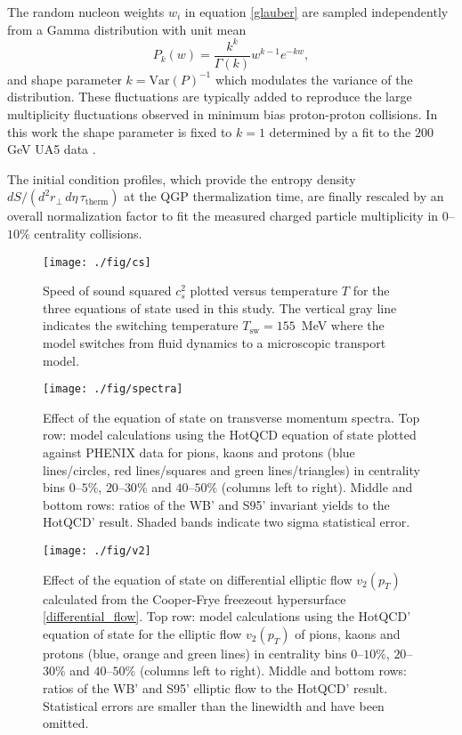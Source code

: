 \documentclass[aps,prc,reprint,amsmath,nofootinbib,superscriptaddress]{revtex4-1}
\begin{document}
The random nucleon weights $w_i$ in equation \eqref{glauber} are sampled independently from a Gamma distribution with unit mean
\begin{equation}
 P_k(w) = \frac{k^k}{\Gamma(k)} w^{k-1} e^{-k w},
\end{equation}
and shape parameter $k = \text{Var}(P)^{-1}$ which modulates the variance of the distribution. 
These fluctuations are typically added \cite{?} to reproduce the large multiplicity fluctuations observed in minimum bias proton-proton collisions. 
In this work the shape parameter is fixed to $k=1$ determined by a fit to the $200$ GeV UA5 data \cite{?}. 

The initial condition profiles, which provide the entropy density $dS/(d^2r_\perp\, d\eta\, \tau_\text{therm})$ at the QGP thermalization time, are finally 
rescaled by an overall normalization factor to fit the measured charged particle multiplicity in $0$--$10\%$ centrality collisions.

\begin{figure}
  \texttt{[image: ./fig/cs]}
  \caption{\label{fig:cs} Speed of sound squared $c_s^2$ plotted versus temperature $T$ for the three equations of state used in this study. The vertical
	   gray line indicates the switching temperature $T_\text{sw} = 155$~MeV where the model switches from fluid dynamics to a microscopic transport model.}
\end{figure}

\begin{figure*}[t]
  \texttt{[image: ./fig/spectra]}
  \caption{
    \label{fig:spectra} Effect of the equation of state on transverse momentum spectra. Top row: model calculations using the HotQCD equation of state plotted against 
    PHENIX data for pions, kaons and protons (blue lines/circles, red lines/squares and green lines/triangles) in centrality bins $0$--$5\%$, $20$--$30\%$ and $40$--$50\%$ 
    (columns left to right). Middle and bottom rows: ratios of the WB' and S95' invariant yields to the HotQCD' result. Shaded bands indicate two sigma statistical error. }
\end{figure*}

\begin{figure*}[t]
  \texttt{[image: ./fig/v2]}
  \caption{
    \label{fig:v2} Effect of the equation of state on differential elliptic flow $v_2(p_T)$ calculated from the Cooper-Frye freezeout hypersurface \eqref{differential_flow}.
    Top row: model calculations using the HotQCD' equation of state for the elliptic flow $v_2(p_T)$  of pions, kaons and protons (blue, orange and green lines) 
    in centrality bins $0$--$10\%$, $20$--$30\%$ and $40$--$50\%$ (columns left to right). Middle and bottom rows: ratios of the WB' and S95' elliptic flow to 
    the HotQCD' result. Statistical errors are smaller than the linewidth and have been omitted.
  }
\end{figure*}
\end{document}
